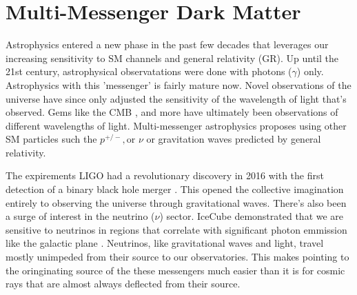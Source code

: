\section{Multi-Messenger Dark Matter \label{sec:mult-messengerDM}}

Astrophysics entered a new phase in the past few decades that leverages our increasing sensitivity to SM channels and general relativity (GR).
Up until the 21st century, astrophysical observatations were done with photons ($\gamma$) only.
Astrophysics with this 'messenger' is fairly mature now.
Novel observations of the universe have since only adjusted the sensitivity of the wavelength of light that's observed.
Gems like the CMB \cite{Plank:CMB}, and more have ultimately been observations of different wavelengths of light.
Multi-messenger astrophysics proposes using other SM particles such the $p^{+/-},\text{or } \nu$ or gravitation waves predicted by general relativity.

The expirements LIGO had a revolutionary discovery in 2016 with the first detection of a binary black hole merger \cite{2016:grav_waves}.
This opened the collective imagination entirely to observing the universe through gravitational waves.
There's also been a surge of interest in the neutrino ($\nu$) sector.
IceCube demonstrated that we are sensitive to neutrinos in regions that correlate with significant photon emmission like the galactic plane \cite{2023:IC3_galactic_plane}.
Neutrinos, like gravitational waves and light, travel mostly unimpeded from their source to our observatories.
This makes pointing to the oringinating source of the these messengers much easier than it is for cosmic rays that are almost always deflected from their source.

